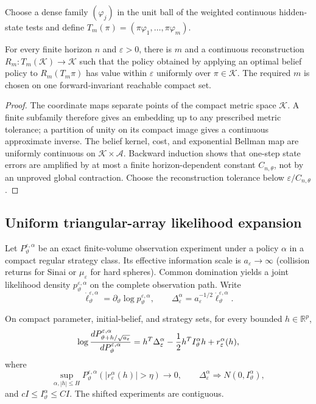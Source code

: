 Choose a dense family $(\varphi_j)$ in the unit ball of the weighted continuous
hidden-state tests and define
$T_m(\pi)=(\pi\varphi_1,\ldots,\pi\varphi_m)$.

\begin{proposition}
\label{prop:r21-c1-finite}
For every finite horizon $n$ and $\varepsilon>0$, there is $m$ and a continuous
reconstruction $R_m:T_m(\mathcal K)\to\mathcal K$ such that the policy obtained
by applying an optimal belief policy to $R_m(T_m\pi)$ has value within
$\varepsilon$ uniformly over $\pi\in\mathcal K$.  The required $m$ is chosen on
one forward-invariant reachable compact set.
\end{proposition}

\begin{proof}
The coordinate maps separate points of the compact metric space
$\mathcal K$.  A finite subfamily therefore gives an embedding up to any
prescribed metric tolerance; a partition of unity on its compact image gives
a continuous approximate inverse.  The belief kernel, cost, and exponential
Bellman map are uniformly continuous on
$\mathcal K\times\mathcal A$.  Backward induction shows that one-step state
errors are amplified by at most a finite horizon-dependent constant
$C_{n,\theta}$, not by an unproved global contraction.  Choose the reconstruction
tolerance below $\varepsilon/C_{n,\theta}$.
\end{proof}

\subsection{Uniform triangular-array likelihood expansion}

Let $P_{\vartheta}^{\varepsilon,\alpha}$ be an exact finite-volume observation
experiment under a policy $\alpha$ in a compact regular strategy class.  Its
effective information scale is $a_\varepsilon\to\infty$ (collision returns for
Sinai or $\mu_\varepsilon$ for hard spheres).  Common domination yields a
joint likelihood density $p_\vartheta^{\varepsilon,\alpha}$ on the complete
observation path.  Write
\[
 \dot\ell_{\vartheta}^{\varepsilon,\alpha}
 =\partial_\vartheta\log p_\vartheta^{\varepsilon,\alpha},
 \qquad
 \Delta_\varepsilon^\alpha=
 a_\varepsilon^{-1/2}\dot\ell_\vartheta^{\varepsilon,\alpha}.
\]

\begin{theorem}
\label{thm:r21-c1-lan}
On compact parameter, initial-belief, and strategy sets, for every bounded
$h\in\mathbb R^p$,
\[
 \log {dP_{\vartheta+h/\sqrt{a_\varepsilon}}^{\varepsilon,\alpha}
           \over
           dP_{\vartheta}^{\varepsilon,\alpha}}
 =h^T\Delta_\varepsilon^\alpha
 -{1\over2}h^TI_\vartheta^\alpha h
 +r_\varepsilon^\alpha(h),
\]
where
\[
 \sup_{\alpha,|h|\le H}
 P_\vartheta^{\varepsilon,\alpha}
 (|r_\varepsilon^\alpha(h)|>\eta)\to0,
 \qquad
 \Delta_\varepsilon^\alpha
 \Longrightarrow N(0,I_\vartheta^\alpha),
\]
and $cI\le I_\vartheta^\alpha\le CI$.  The shifted experiments are contiguous.
\end{theorem}

